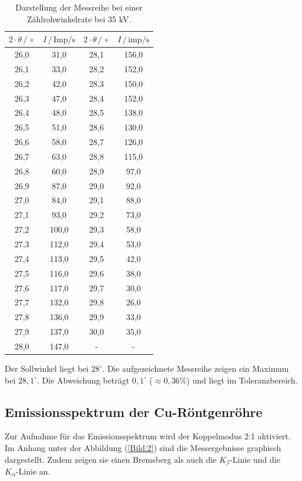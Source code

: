 \begin{table}[H]
  \centering
  \caption{Darstellung der Messreihe bei einer Zählrohwinkelrate bei 35 kV.}
  \label{tab:2}
  \begin{tabular}{c c c c}
  \toprule
  $2\cdot\theta \, / \, \circ$&	$I \, / \, \text{Imp/s}$ &$2\cdot\theta \, / \, \circ$&	$I \, / \, \text{imp/s}$ \\
  \midrule
  26,0&	31,0 &  28,1 &	156,0 \\
  26,1&	33,0 &  28,2 &  152,0 \\
  26,2&	42,0 &  28,3 &  150,0 \\
  26,3&	47,0 &  28,4 &  152,0 \\
  26,4&	48,0 &  28,5 &  138,0 \\
  26,5&	51,0 &  28,6 &  130,0 \\
  26,6&	58,0 &  28,7 &  126,0 \\
  26,7&	63,0 &  28,8 &  115,0 \\
  26,8&	60,0 &  28,9 &   97,0 \\
  26,9&	87,0 &  29,0 &   92,0 \\
  27,0&	84,0 &  29,1 &   88,0 \\
  27,1&	93,0 &  29,2 &   73,0 \\
  27,2&	100,0&  29,3 &   58,0 \\
  27,3&	112,0&  29,4 &   53,0 \\
  27,4&	113,0&  29,5 &   42,0 \\
  27,5&	116,0&  29,6 &   38,0 \\
  27,6&	117,0&  29,7 &   30,0 \\
  27,7&	132,0&  29,8 &   26,0 \\
  27,8&	136,0&  29,9 &   33,0 \\
  27,9&	137,0&  30,0 &   35,0 \\
  28,0&	147,0&    -  &     -  \\
 \bottomrule
\end{tabular}
\end{table}
Der Sollwinkel liegt bei $28^\circ$. Die aufgezeichnete Messreihe zeigen ein Maximum bei $28,1^\circ$.
Die Abweichung beträgt $0,1^\circ$ ($\approx 0,36\%$) und liegt im Toleranzbereich.

\subsection{Emissionsspektrum der Cu-Röntgenröhre}
Zur Aufnahme für das Emissionsspektrum wird der Koppelmodus 2:1 aktiviert. Im Anhang unter der Abbildung (\ref{Bild:2})
sind die Messergebnisse graphisch dargestellt. Zudem zeigen sie einen Bremsberg als auch die
$K_\beta \text{-Linie}$ und die $K_\alpha \text{-Linie}$ an.

